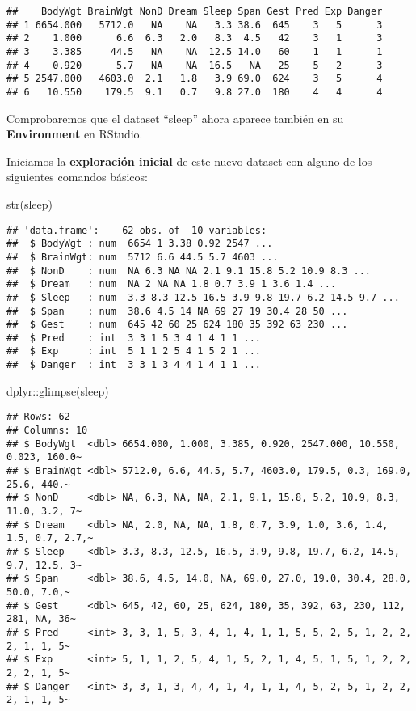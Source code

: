 \documentclass[
]{article}
\newenvironment{Shaded}{\begin{snugshade}}{\end{snugshade}}
\newcommand{\FunctionTok}[1]{\textcolor[rgb]{0.00,0.00,0.00}{#1}}
\newcommand{\NormalTok}[1]{#1}
\newcommand{\SpecialCharTok}[1]{\textcolor[rgb]{0.00,0.00,0.00}{#1}}
\begin{document}
\begin{verbatim}
##    BodyWgt BrainWgt NonD Dream Sleep Span Gest Pred Exp Danger
## 1 6654.000   5712.0   NA    NA   3.3 38.6  645    3   5      3
## 2    1.000      6.6  6.3   2.0   8.3  4.5   42    3   1      3
## 3    3.385     44.5   NA    NA  12.5 14.0   60    1   1      1
## 4    0.920      5.7   NA    NA  16.5   NA   25    5   2      3
## 5 2547.000   4603.0  2.1   1.8   3.9 69.0  624    3   5      4
## 6   10.550    179.5  9.1   0.7   9.8 27.0  180    4   4      4
\end{verbatim}

Comprobaremos que el dataset ``sleep'' ahora aparece también en su
\textbf{Environment} en RStudio.

Iniciamos la \textbf{exploración inicial} de este nuevo dataset con
alguno de los siguientes comandos básicos:

\begin{Shaded}
\begin{Highlighting}[]
\FunctionTok{str}\NormalTok{(sleep)}
\end{Highlighting}
\end{Shaded}

\begin{verbatim}
## 'data.frame':    62 obs. of  10 variables:
##  $ BodyWgt : num  6654 1 3.38 0.92 2547 ...
##  $ BrainWgt: num  5712 6.6 44.5 5.7 4603 ...
##  $ NonD    : num  NA 6.3 NA NA 2.1 9.1 15.8 5.2 10.9 8.3 ...
##  $ Dream   : num  NA 2 NA NA 1.8 0.7 3.9 1 3.6 1.4 ...
##  $ Sleep   : num  3.3 8.3 12.5 16.5 3.9 9.8 19.7 6.2 14.5 9.7 ...
##  $ Span    : num  38.6 4.5 14 NA 69 27 19 30.4 28 50 ...
##  $ Gest    : num  645 42 60 25 624 180 35 392 63 230 ...
##  $ Pred    : int  3 3 1 5 3 4 1 4 1 1 ...
##  $ Exp     : int  5 1 1 2 5 4 1 5 2 1 ...
##  $ Danger  : int  3 3 1 3 4 4 1 4 1 1 ...
\end{verbatim}

\begin{Shaded}
\begin{Highlighting}[]
\NormalTok{dplyr}\SpecialCharTok{::}\FunctionTok{glimpse}\NormalTok{(sleep)}
\end{Highlighting}
\end{Shaded}

\begin{verbatim}
## Rows: 62
## Columns: 10
## $ BodyWgt  <dbl> 6654.000, 1.000, 3.385, 0.920, 2547.000, 10.550, 0.023, 160.0~
## $ BrainWgt <dbl> 5712.0, 6.6, 44.5, 5.7, 4603.0, 179.5, 0.3, 169.0, 25.6, 440.~
## $ NonD     <dbl> NA, 6.3, NA, NA, 2.1, 9.1, 15.8, 5.2, 10.9, 8.3, 11.0, 3.2, 7~
## $ Dream    <dbl> NA, 2.0, NA, NA, 1.8, 0.7, 3.9, 1.0, 3.6, 1.4, 1.5, 0.7, 2.7,~
## $ Sleep    <dbl> 3.3, 8.3, 12.5, 16.5, 3.9, 9.8, 19.7, 6.2, 14.5, 9.7, 12.5, 3~
## $ Span     <dbl> 38.6, 4.5, 14.0, NA, 69.0, 27.0, 19.0, 30.4, 28.0, 50.0, 7.0,~
## $ Gest     <dbl> 645, 42, 60, 25, 624, 180, 35, 392, 63, 230, 112, 281, NA, 36~
## $ Pred     <int> 3, 3, 1, 5, 3, 4, 1, 4, 1, 1, 5, 5, 2, 5, 1, 2, 2, 2, 1, 1, 5~
## $ Exp      <int> 5, 1, 1, 2, 5, 4, 1, 5, 2, 1, 4, 5, 1, 5, 1, 2, 2, 2, 2, 1, 5~
## $ Danger   <int> 3, 3, 1, 3, 4, 4, 1, 4, 1, 1, 4, 5, 2, 5, 1, 2, 2, 2, 1, 1, 5~
\end{verbatim}
\end{document}
